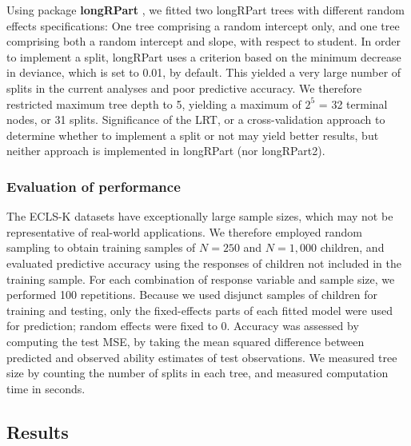 \documentclass[doc,floatsintext,natbib]{apa7}
\begin{document}
Using package \textbf{longRPart} \citep[version 1.0][]{StewyAbdo12}, we fitted two longRPart trees with different random effects specifications: One tree comprising a random intercept only, and one tree comprising both a random intercept and slope, with respect to student. In order to implement a split, longRPart uses a criterion based on the minimum decrease in deviance, which is set to 0.01, by default. This yielded a very large number of splits in the current analyses and poor predictive accuracy. We therefore restricted maximum tree depth to 5, yielding a maximum of $2^5$ = 32 terminal nodes, or 31 splits. Significance of the LRT, or a cross-validation approach to determine whether to implement a split or not may yield better results, but neither approach is implemented in longRPart (nor longRPart2). 



\subsubsection{Evaluation of performance}

The ECLS-K datasets have exceptionally large sample sizes, which may not be representative of real-world applications. We therefore employed random sampling to obtain training samples of $N=250$ and $N=1,000$ children, and evaluated predictive accuracy using the responses of children not included in the training sample. For each combination of response variable and sample size, we performed 100 repetitions. Because we used disjunct samples of children for training and testing, only the fixed-effects parts of each fitted model were used for prediction; random effects were fixed to 0. Accuracy was assessed by computing the test MSE, by taking the mean squared difference between predicted and observed ability estimates of test observations. We measured tree size by counting the number of splits in each tree, and measured computation time in seconds. 


\subsection{Results}
\end{document}
